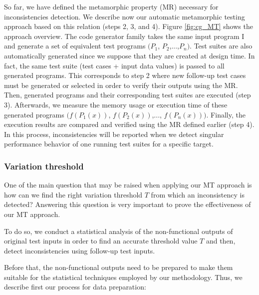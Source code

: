 So far, we have defined the metamorphic property (MR) necessary for inconsistencies detection. We describe now our automatic metamorphic testing approach based on this relation (steps 2, 3, and 4). 
Figure \ref{fig:cg_MT} shows the approach overview.
The code generator family takes the same input program I and generate a set of equivalent test programs $(P_{1}$, $P_{2}$,...,$P_{n})$. Test suites are also automatically generated since we suppose that they are created at design time. In fact, the same test suite (test cases + input data values) is passed to all generated programs. This corresponds to step 2 where new follow-up test cases must be generated or selected in order to verify their outputs using the MR. 
Then, generated programs and their corresponding test suites are executed (step 3). Afterwards, we measure the memory usage or execution time of these generated programs $(f(P_{1}(x))$, $f(P_{2}(x))$,..., $f(P_{n}(x)))$. Finally, the execution results are compared and verified using the MR defined earlier (step 4).
In this process, inconsistencies will be reported when we detect singular performance behavior of one running test suites for a specific target.





\subsubsection{Variation threshold}
\label{sec:cg-Variation threshold}
One of the main question that may be raised when applying our MT approach is how can we find the right variation threshold $T$ from which an inconsistency is detected? Answering this question is very important to prove the effectiveness of our MT approach.

To do so, we conduct a statistical analysis of the non-functional outputs of original test inputs in order to find an accurate threshold value $T$ and then, detect inconsistencies using follow-up test inputs.
 
Before that, the non-functional outputs need to be prepared to make them suitable for the statistical techniques employed by our methodology. Thus, we describe first our process for data preparation:

